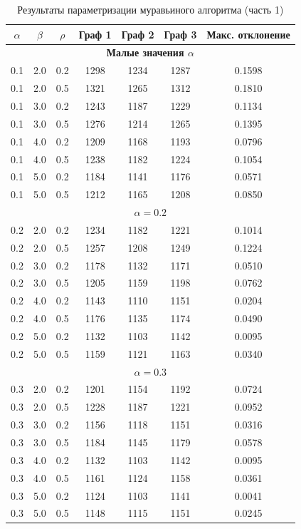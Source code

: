 \begin{table}[h!]
	\centering
	\caption{Результаты параметризации муравьиного алгоритма (часть 1)}
	\label{tab:param-full-1}
	\renewcommand{\arraystretch}{1.2}
	\small
	\begin{tabular}{|c|c|c|c|c|c|c|}
		\hline
		$\alpha$ & $\beta$ & $\rho$ & Граф 1 & Граф 2 & Граф 3 & Макс. отклонение \\ \hline
		\hline
		\multicolumn{7}{|c|}{\textbf{Малые значения $\alpha$}} \\ \hline
		0.1 & 2.0 & 0.2 & 1298 & 1234 & 1287 & 0.1598 \\ \hline
		0.1 & 2.0 & 0.5 & 1321 & 1265 & 1312 & 0.1810 \\ \hline
		0.1 & 3.0 & 0.2 & 1243 & 1187 & 1229 & 0.1134 \\ \hline
		0.1 & 3.0 & 0.5 & 1276 & 1214 & 1265 & 0.1395 \\ \hline
		0.1 & 4.0 & 0.2 & 1209 & 1168 & 1193 & 0.0796 \\ \hline
		0.1 & 4.0 & 0.5 & 1238 & 1182 & 1224 & 0.1054 \\ \hline
		0.1 & 5.0 & 0.2 & 1184 & 1141 & 1176 & 0.0571 \\ \hline
		0.1 & 5.0 & 0.5 & 1212 & 1165 & 1208 & 0.0850 \\ \hline
		\hline
		\multicolumn{7}{|c|}{\textbf{$\alpha = 0.2$}} \\ \hline
		0.2 & 2.0 & 0.2 & 1234 & 1182 & 1221 & 0.1014 \\ \hline
		0.2 & 2.0 & 0.5 & 1257 & 1208 & 1249 & 0.1224 \\ \hline
		0.2 & 3.0 & 0.2 & 1178 & 1132 & 1171 & 0.0510 \\ \hline
		0.2 & 3.0 & 0.5 & 1205 & 1159 & 1198 & 0.0762 \\ \hline
		0.2 & 4.0 & 0.2 & 1143 & 1110 & 1151 & 0.0204 \\ \hline
		0.2 & 4.0 & 0.5 & 1176 & 1135 & 1174 & 0.0490 \\ \hline
		0.2 & 5.0 & 0.2 & 1132 & 1103 & 1142 & 0.0095 \\ \hline
		0.2 & 5.0 & 0.5 & 1159 & 1121 & 1163 & 0.0340 \\ \hline
		\hline
		\multicolumn{7}{|c|}{\textbf{$\alpha = 0.3$}} \\ \hline
		0.3 & 2.0 & 0.2 & 1201 & 1154 & 1192 & 0.0724 \\ \hline
		0.3 & 2.0 & 0.5 & 1228 & 1187 & 1221 & 0.0952 \\ \hline
		0.3 & 3.0 & 0.2 & 1156 & 1118 & 1151 & 0.0316 \\ \hline
		0.3 & 3.0 & 0.5 & 1184 & 1145 & 1179 & 0.0578 \\ \hline
		0.3 & 4.0 & 0.2 & 1132 & 1103 & 1142 & 0.0095 \\ \hline
		0.3 & 4.0 & 0.5 & 1161 & 1124 & 1158 & 0.0361 \\ \hline
		0.3 & 5.0 & 0.2 & 1124 & 1103 & 1141 & 0.0041 \\ \hline
		0.3 & 5.0 & 0.5 & 1148 & 1115 & 1151 & 0.0245 \\ \hline
	\end{tabular}
\end{table}

